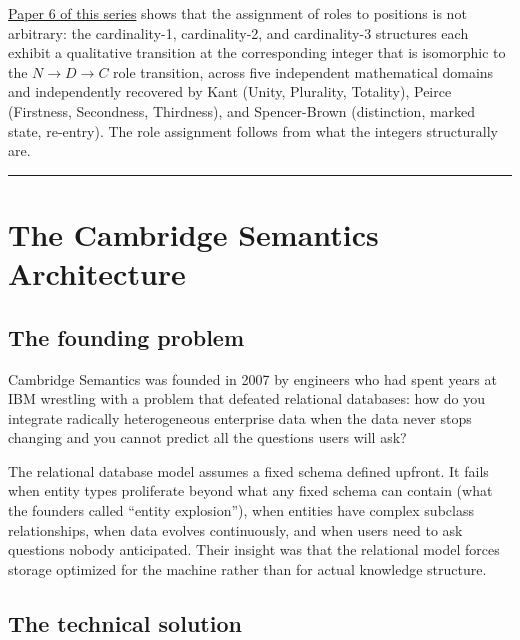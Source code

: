 \documentclass[12pt]{article}
\begin{document}
\href{https://github.com/baardev/truevalue/blob/main/docnav/Research/papers/6_qualitative-nature-integers-triadic-roles/6_qualitative-nature-integers-triadic-roles.pdf}{Paper
6 of this series} shows that the assignment of roles to positions is not
arbitrary: the cardinality-1, cardinality-2, and cardinality-3
structures each exhibit a qualitative transition at the corresponding
integer that is isomorphic to the \(N \to D \to C\) role transition,
across five independent mathematical domains and independently recovered
by Kant (Unity, Plurality, Totality), Peirce (Firstness, Secondness,
Thirdness), and Spencer-Brown (distinction, marked state, re-entry). The
role assignment follows from what the integers structurally are.

\begin{center}\rule{0.5\linewidth}{0.5pt}\end{center}

\section{The Cambridge Semantics Architecture}\label{the-cambridge-semantics-architecture}

\subsection{The founding problem}\label{the-founding-problem}

Cambridge Semantics was founded in 2007 by engineers who had spent years
at IBM wrestling with a problem that defeated relational databases: how
do you integrate radically heterogeneous enterprise data when the data
never stops changing and you cannot predict all the questions users will
ask?

The relational database model assumes a fixed schema defined upfront. It
fails when entity types proliferate beyond what any fixed schema can
contain (what the founders called ``entity explosion''), when entities
have complex subclass relationships, when data evolves continuously, and
when users need to ask questions nobody anticipated. Their insight was
that the relational model forces storage optimized for the machine
rather than for actual knowledge structure.

\subsection{The technical solution}\label{the-technical-solution}
\end{document}
